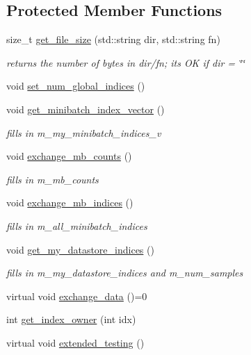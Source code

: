 \subsection*{Protected Member Functions}
\begin{DoxyCompactItemize}
\item 
size\+\_\+t \hyperlink{classlbann_1_1generic__data__store_a7641d15eba63426acf5071acb8026442}{get\+\_\+file\+\_\+size} (std\+::string dir, std\+::string fn)
\begin{DoxyCompactList}\small\item\em returns the number of bytes in dir/fn; it\textquotesingle{}s OK if dir = \char`\"{}\char`\"{} \end{DoxyCompactList}\item 
void \hyperlink{classlbann_1_1generic__data__store_a694438e0c70be757cc020ffc918fb165}{set\+\_\+num\+\_\+global\+\_\+indices} ()
\item 
void \hyperlink{classlbann_1_1generic__data__store_ab861db5f81e45a6063b8922a331dd007}{get\+\_\+minibatch\+\_\+index\+\_\+vector} ()
\begin{DoxyCompactList}\small\item\em fills in m\+\_\+my\+\_\+minibatch\+\_\+indices\+\_\+v \end{DoxyCompactList}\item 
void \hyperlink{classlbann_1_1generic__data__store_abd5bf0321c063996369e1e2659bd99aa}{exchange\+\_\+mb\+\_\+counts} ()
\begin{DoxyCompactList}\small\item\em fills in m\+\_\+mb\+\_\+counts \end{DoxyCompactList}\item 
void \hyperlink{classlbann_1_1generic__data__store_aa0ef8d7528f6775d47641ffe5ac229da}{exchange\+\_\+mb\+\_\+indices} ()
\begin{DoxyCompactList}\small\item\em fills in m\+\_\+all\+\_\+minibatch\+\_\+indices \end{DoxyCompactList}\item 
void \hyperlink{classlbann_1_1generic__data__store_a3558f87939755b08ae151623a5799127}{get\+\_\+my\+\_\+datastore\+\_\+indices} ()
\begin{DoxyCompactList}\small\item\em fills in m\+\_\+my\+\_\+datastore\+\_\+indices and m\+\_\+num\+\_\+samples \end{DoxyCompactList}\item 
virtual void \hyperlink{classlbann_1_1generic__data__store_a5a34663fbbc3714d45743a6ca7195f51}{exchange\+\_\+data} ()=0
\item 
int \hyperlink{classlbann_1_1generic__data__store_ad0de5ac2cdcf3f692acb252a019a2aed}{get\+\_\+index\+\_\+owner} (int idx)
\item 
virtual void \hyperlink{classlbann_1_1generic__data__store_ae569426f71f9317e88fe1078d58c98e7}{extended\+\_\+testing} ()
\end{DoxyCompactItemize}
